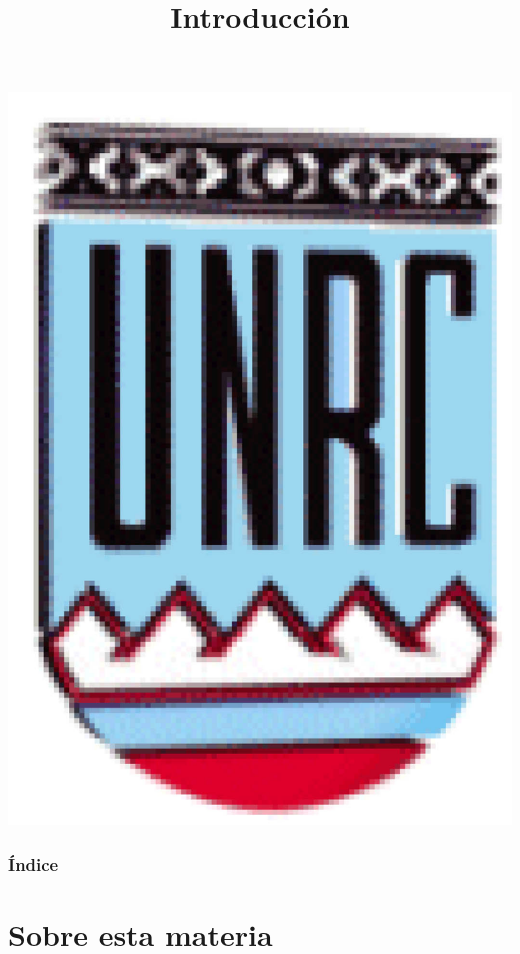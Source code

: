 \documentclass[handout,hyperref={colorlinks=true}]{beamer}
\title[Introducción] %
{%
 Introducción
}
\begin{document}
\begin{frame}
  \maketitle
  \begin{center}
   \includegraphics[scale=0.2]{imagenes/unrc.jpg}
   \end{center}
\end{frame}



\begin{frame}    
\frametitle{Índice}
\tableofcontents
\end{frame}







\section{Sobre esta materia}
\end{document}

